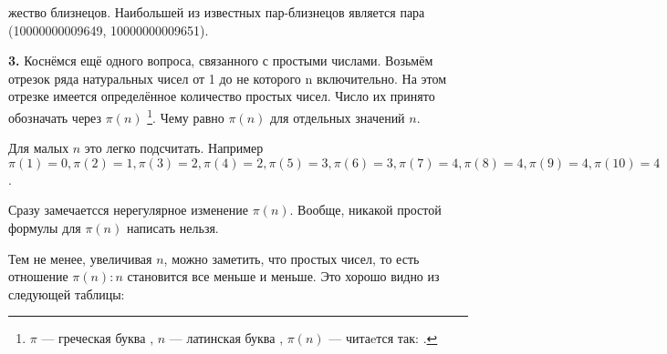 

\pagestyle{pagenumberfooterright}
\setcounter{page}{57}

% 

\newcommand{\QL}{\guillemotleft{}}
\newcommand{\QR}{\guillemotright{}}
\newcommand{\CellAlignCenter}[2]{\multicolumn{1}{#1}{#2}}
\newcommand{\xrowht}[2][0]{\addstackgap[.5\dimexpr#2\relax]{\vphantom{#1}}}

\let\origthefootnote\thefootnote
\renewcommand{\thefootnote}{\origthefootnote)}

жество близнецов. Наибольшей из известных пар-близнецов является пара (10000000009649, 10000000009651).

\textbf{3.}
Коснёмся ещё одного вопроса, связанного с простыми числами. Возьмём отрезок ряда натуральных чисел от 1 до не которого n включительно. На этом отрезке имеется определённое количество простых чисел. Число их принято обозначать через $\pi(n)$ \footnote{$\pi$ --- греческая буква , $n$ --- латинская буква , $\pi(n)$ --- читаeтся так: .}. Чему равно $\pi(n)$ для отдельных значений $n$.

Для малых $n$ это легко подсчитать. Например $\pi(1) = 0, \pi(2) = 1, \pi(3) = 2, \pi(4) = 2, \pi(5) = 3, \pi(6) = 3, \pi(7) = 4, \pi(8) = 4, \pi(9) = 4, \pi(10) = 4$.

Сразу замечаетсся нерегулярное изменение $\pi(n)$. Вообще, никакой простой формулы для $\pi(n)$ написать нельзя.

Тем не менее, увеличивая $n$, можно заметить, что  простых чисел, то есть отношение $\pi(n):n$ становится все меньше и меньше. Это хорошо видно из следующей таблицы:

\vspace{5mm}

